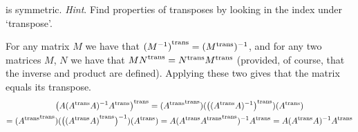 \begin{exercises}
    is symmetric. 
    \cite{Strang}
    \textit{Hint}.  Find properties of transposes by looking in the index
      under `transpose'.
    \begin{answer}
      For any matrix $M$ we have that ${{(M^{-1})}^{\rm trans}}=({{M}^{\rm trans}})^{-1}$,
      and for any two matrices $M$, $N$ we have that 
      ${{MN}^{\rm trans}}={{N}^{\rm trans}}{{M}^{\rm trans}}$ (provided, of course, 
      that the inverse and product are defined).
      Applying these two gives that the matrix equals its transpose.
      \begin{multline*}
         {{\bigl(A( {{A}^{\rm trans}} A)^{-1} {{A}^{\rm trans}} \bigr)}^{\rm trans}}
         =({{{{A}^{\rm trans}}}^{\rm trans}})
           ({{\bigl(({{A}^{\rm trans}}A)^{-1}\bigr)}^{\rm trans}})
           ({{A}^{\rm trans}})                               \\
         =({{{{A}^{\rm trans}}}^{\rm trans}})
           ( \bigl({{({{A}^{\rm trans}}A)}^{\rm trans}}\bigr)^{-1} )
           ({{A}^{\rm trans}})                    
         =A
           ({{A}^{\rm trans}}{{{{A}^{\rm trans}}}^{\rm trans}})^{-1}
           {{A}^{\rm trans}}
         =A
           ({{A}^{\rm trans}}A)^{-1}
           {{A}^{\rm trans}}
      \end{multline*}
    \end{answer}
\end{exercises}
